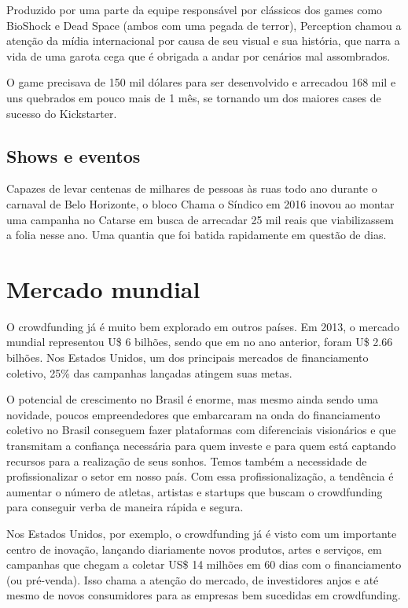 \documentclass{classe_cn}                 %
\begin{document}
Produzido por uma parte da equipe responsável por clássicos dos games como BioShock e Dead Space (ambos com uma pegada de terror), Perception chamou a atenção da mídia internacional por causa de seu visual e sua história, que narra a vida de uma garota cega que é obrigada a andar por cenários mal assombrados.

O game precisava de 150 mil dólares para ser desenvolvido e arrecadou 168 mil e uns quebrados em pouco mais de 1 mês, se tornando um dos maiores cases de sucesso do Kickstarter.

\subsection{Shows e eventos}

Capazes de levar centenas de milhares de pessoas às ruas todo ano durante o carnaval de Belo Horizonte, o bloco Chama o Síndico em 2016 inovou ao montar uma campanha no Catarse em busca de arrecadar 25 mil reais que viabilizassem a folia nesse ano. Uma quantia que foi batida rapidamente em questão de dias.

\section{Mercado mundial}

O crowdfunding já é muito bem explorado em outros países. Em 2013, o mercado mundial representou U\$ 6 bilhões, sendo que em no ano anterior, foram U\$ 2.66 bilhões. Nos Estados Unidos, um dos principais mercados de financiamento coletivo, 25\% das campanhas lançadas atingem suas metas.

O potencial de crescimento no Brasil é enorme, mas mesmo ainda sendo uma novidade, poucos empreendedores que embarcaram na onda do financiamento coletivo no Brasil conseguem fazer plataformas com diferenciais visionários e que transmitam a confiança necessária para quem investe e para quem está captando recursos para a realização de seus sonhos. Temos também a necessidade de profissionalizar o setor em nosso país. Com essa profissionalização, a tendência é aumentar o número de atletas, artistas e startups que buscam o crowdfunding para conseguir verba de maneira rápida e segura.

Nos Estados Unidos, por exemplo, o crowdfunding já é visto com um importante centro de inovação, lançando diariamente novos produtos, artes e serviços, em campanhas que chegam a coletar US\$ 14 milhões em 60 dias com o financiamento (ou pré-venda). Isso chama a atenção do mercado, de investidores anjos e até mesmo de novos consumidores para as empresas bem sucedidas em crowdfunding.
\end{document}

